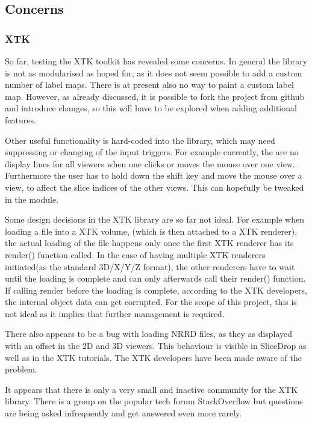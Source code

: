 \documentclass[a4paper,11pt,titlepage]{article}
\begin{document}
\subsection{Concerns}

\subsubsection{XTK}

So far, testing the XTK toolkit has revealed some concerns. In general the library is not as modularised as hoped for, as it does not seem possible to add a custom number of label maps. There is at present also no way to paint a custom label map. However, as already discussed, it is possible to fork the project from github and introduce changes, so this will have to be explored when adding additional features.

Other useful functionality is hard-coded into the library, which may need suppressing or changing of the input triggers. For example currently, the are no display lines for all viewers when one clicks or moves the mouse over one view. Furthermore the user has to hold down the shift key and move the mouse over a view, to affect the slice indices of the other views. This can hopefully be tweaked in the module.

Some design decisions in the XTK library are so far not ideal. For example when loading a file into a XTK volume, (which is then attached to a XTK renderer), the actual loading of the file happens only once the first XTK renderer has its render() function called. In the case of having multiple XTK renderers initiated(as the standard 3D/X/Y/Z format), the other renderers have to wait until the loading is complete and can only afterwards call their render() function. If calling render before the loading is complete, according to the XTK developers, the internal object data can get corrupted. For the scope of this project, this is not ideal as it implies that further management is required.

There also appears to be a bug with loading NRRD files, as they as displayed with an offset in the 2D and 3D viewers. This behaviour is visible in SliceDrop as well as in the XTK tutorials. The XTK developers have been made aware of the problem.

It appears that there is only a very small and inactive community for the XTK library. There is a group on the popular tech forum StackOverflow but questions are being asked infrequently and get answered even more rarely.
\end{document}

